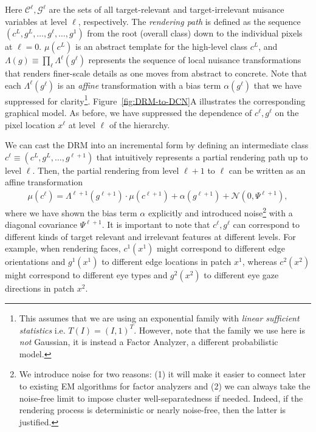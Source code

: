 \documentclass[12pt]{article}
\newcommand{\Cl}[0]{{ \mathcal{C} }}
\newcommand{\G}[0]{{ \mathcal{G} }}
\begin{document}
Here $\Cl^{\ell}, \G^{\ell}$ are the sets of all target-relevant and target-irrelevant nuisance variables at level $\ell$, respectively. The \emph{rendering path} is defined as the sequence $(c^{L},g^{L},\ldots,g^{\ell},\ldots,g^{1})$ from the root (overall class) down to the individual pixels at $\ell=0$.  $\mu(c^{L})$ is an abstract template for the high-level class $c^{L}$, and $\Lambda(g) \equiv \prod_{\ell} \Lambda^{\ell}(g^{\ell})$ represents the sequence of local nuisance transformations that renders finer-scale details as one moves from abstract to concrete. 
Note that each $\Lambda^{\ell}(g^{\ell})$ is an \emph{affine} transformation with a bias term $\alpha(g^{\ell})$ that we have suppressed for clarity\footnote{This assumes that we are using an exponential family with {\em linear sufficient statistics} i.e. $T(I) = (I, 1)^{T}$. However, note that the family we use here is {\em not} Gaussian, it is instead a Factor Analyzer, a different probabilistic model.}.
Figure~\ref{fig:DRM-to-DCN}A illustrates the corresponding graphical model. As before, we have suppressed the dependence of $c^{\ell},g^{\ell}$ on the pixel location $x^\ell$ at level $\ell$ of the hierarchy.

We can cast the DRM into an incremental form by defining an intermediate class $c^{\ell} \equiv (c^{L}, g^{L}, \ldots, g^{\ell+1})$ that intuitively represents a partial rendering path up to level $\ell$. Then, the partial rendering from level $\ell+1$ to $\ell$ can be written as an affine transformation
\begin{align} 
   \mu(c^{\ell}) = \Lambda^{\ell+1}(g^{\ell+1}) \cdot \mu(c^{\ell+1}) + \alpha(g^{\ell+1}) + \mathcal{N}(0, \Psi^{\ell+1}),
   \label{eqn:incDRM}
\end{align}
where we have shown the bias term $\alpha$ explicitly and introduced noise\footnote{We introduce noise for two reasons: (1) it will make it easier to connect later to existing EM algorithms for factor analyzers and (2) we can always take the noise-free limit to impose cluster well-separatedness if needed. Indeed, if the rendering process is deterministic or nearly noise-free, then the latter is justified.} with a diagonal covariance $\Psi^{\ell+1}$. It is important to note that $c^{\ell}, g^\ell$ can correspond to different kinds of target relevant and irrelevant features at different levels.
For example, when rendering faces, $c^1(x^1)$ might correspond to different edge orientations and $g^1(x^1)$ to different edge locations in patch $x^{1}$, whereas $c^2(x^2)$ might correspond to different eye types and $g^2(x^2)$ to different eye gaze directions in patch $x^{2}$.
\end{document}
